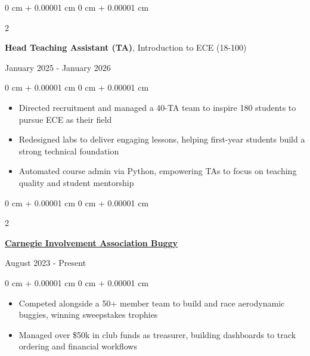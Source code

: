 \documentclass[10pt, letterpaper]{article}
\newlength{\betweenEntriesSpace}
\newlength{\entryToBulletsSpace}
\newlength{\bulletsTopSep}
\newlength{\bulletsParsep}
\newenvironment{highlights}{
    \begin{itemize}[
        label=-,
        topsep=\bulletsTopSep,
        parsep=\bulletsParsep,
        partopsep=0pt,
        itemsep=0pt,
        leftmargin=0 cm + 10pt
    ]
}{
    \end{itemize}
} %
\newenvironment{onecolentry}{
    \begin{adjustwidth}{
        0 cm + 0.00001 cm
    }{
        0 cm + 0.00001 cm
    }
}{
    \end{adjustwidth}
} %
\newenvironment{twocolentry}[2][]{
    \onecolentry
    \def\secondColumn{#2}
    \setcolumnwidth{\fill, 4.5 cm}
    \begin{paracol}{2}
}{
    \switchcolumn \raggedleft \secondColumn
    \end{paracol}
    \endonecolentry
} %
\begin{document}
        \vspace{\betweenEntriesSpace} %

        \begin{twocolentry}
            {January 2025 - January 2026}
            {\textbf{Head Teaching Assistant (TA)}, Introduction to ECE (18-100) \\}
        \end{twocolentry}
        \vspace{\entryToBulletsSpace}
        \begin{onecolentry}
            \begin{highlights}

                \item Directed recruitment and managed a 40-TA team to inspire 180 students to pursue ECE as their field
                \item Redesigned labs to deliver engaging lessons, helping first-year students build a strong technical foundation
                \item Automated course admin via Python, empowering TAs to focus on teaching quality and student mentorship
        
            \end{highlights}
        \end{onecolentry}

        \vspace{\betweenEntriesSpace} %

        \begin{twocolentry}
            {August 2023 - Present}
            {\href{https://tartanconnect.cmu.edu/cia/top/}{\textbf{Carnegie Involvement Association Buggy}}}
        \end{twocolentry}
        \vspace{\entryToBulletsSpace}
        \begin{onecolentry}
            \begin{highlights}
                \item Competed alongside a 50+ member team to build and race aerodynamic buggies, winning sweepstakes trophies
                \item Managed over \$50k in club funds as treasurer, building dashboards to track ordering and financial workflows
            \end{highlights}
        \end{onecolentry}
\end{document}
